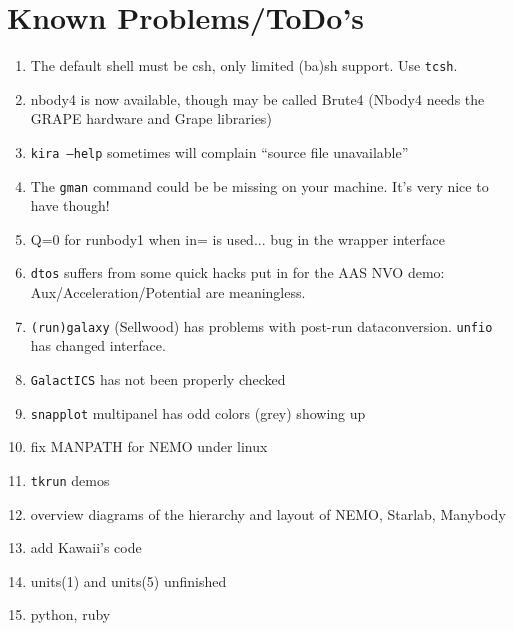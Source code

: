 \section{Known Problems/ToDo's}
\begin{enumerate}

\item
The default shell must be csh, only limited (ba)sh support. Use {\tt tcsh}.

\item
nbody4 is now available, though may be called Brute4 (Nbody4 needs the
GRAPE hardware and Grape libraries)

\item
{\tt kira --help} sometimes will complain ``source file unavailable''

\item
The {\tt gman} command could be be missing on your machine. 
It's very nice to have though!

\item
Q=0 for runbody1 when in= is used...   bug in the wrapper interface

\item
{\tt dtos} suffers from some quick hacks put in for the AAS NVO demo:
Aux/Acceleration/Potential are meaningless.

\item
{\tt (run)galaxy} (Sellwood) has problems with post-run dataconversion. 
{\tt unfio} has changed interface.

\item
{\tt GalactICS} has not been properly checked 

\item
{\tt snapplot} multipanel has odd colors (grey) showing up

\item
fix MANPATH for NEMO under linux

\item
{\tt tkrun} demos

\item
overview diagrams of the hierarchy and layout of NEMO, Starlab, Manybody

\item
add Kawaii's code

\item
units(1) and units(5) unfinished

\item
python, ruby

\end{enumerate}

